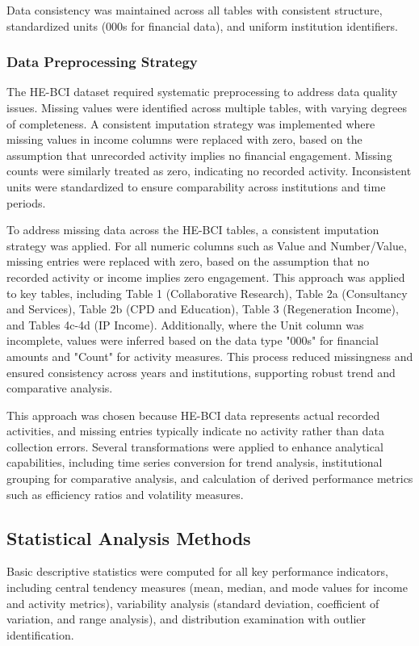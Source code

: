 \documentclass[journal,onecolumn, 10pt,draftclsnofoot]{IEEEtran}
\begin{document}
Data consistency was maintained across all tables with consistent structure, standardized units (\textsterling 000s for financial data), and uniform institution identifiers.

\subsubsection{Data Preprocessing Strategy}
The HE-BCI dataset required systematic preprocessing to address data quality issues. Missing values were identified across multiple tables, with varying degrees of completeness. A consistent imputation strategy was implemented where missing values in income columns were replaced with zero, based on the assumption that unrecorded activity implies no financial engagement. Missing counts were similarly treated as zero, indicating no recorded activity. Inconsistent units were standardized to ensure comparability across institutions and time periods.

To address missing data across the HE-BCI tables, a consistent imputation strategy was applied. For all numeric columns such as Value and Number/Value, missing entries were replaced with zero, based on the assumption that no recorded activity or income implies zero engagement. This approach was applied to key tables, including Table 1 (Collaborative Research), Table 2a (Consultancy and Services), Table 2b (CPD and Education), Table 3 (Regeneration Income), and Tables 4c-4d (IP Income). Additionally, where the Unit column was incomplete, values were inferred based on the data type "\textsterling 000s" for financial amounts and "Count" for activity measures. This process reduced missingness and ensured consistency across years and institutions, supporting robust trend and comparative analysis.

This approach was chosen because HE-BCI data represents actual recorded activities, and missing entries typically indicate no activity rather than data collection errors. Several transformations were applied to enhance analytical capabilities, including time series conversion for trend analysis, institutional grouping for comparative analysis, and calculation of derived performance metrics such as efficiency ratios and volatility measures.

\subsection{Statistical Analysis Methods}

Basic descriptive statistics were computed for all key performance indicators, including central tendency measures (mean, median, and mode values for income and activity metrics), variability analysis (standard deviation, coefficient of variation, and range analysis), and distribution examination with outlier identification.
\end{document}
